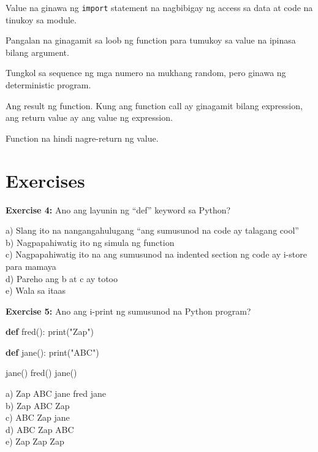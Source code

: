 \documentclass[10pt,]{book}
\newenvironment{Shaded}{}{}
\newcommand{\BuiltInTok}[1]{\textcolor[rgb]{0.00,0.50,0.00}{#1}}
\newcommand{\KeywordTok}[1]{\textcolor[rgb]{0.00,0.44,0.13}{\textbf{#1}}}
\newcommand{\NormalTok}[1]{#1}
\newcommand{\StringTok}[1]{\textcolor[rgb]{0.25,0.44,0.63}{#1}}
\begin{document}
\begin{description}
Value na ginawa ng \texttt{import} statement na nagbibigay ng access sa
data at code na tinukoy sa module. 
\item[parameter]
Pangalan na ginagamit sa loob ng function para tumukoy sa value na
ipinasa bilang argument. 
\item[pseudorandom]
Tungkol sa sequence ng mga numero na mukhang random, pero ginawa ng
deterministic program. 
\item[return value]
Ang result ng function. Kung ang function call ay ginagamit bilang
expression, ang return value ay ang value ng expression.
\item[void function]
Function na hindi nagre-return ng value. 
\end{description}

\section{Exercises}\label{exercises-3}

\textbf{Exercise 4:} Ano ang layunin ng ``def'' keyword sa Python?

a) Slang ito na nangangahulugang ``ang sumusunod na code ay talagang
cool''\\
b) Nagpapahiwatig ito ng simula ng function\\
c) Nagpapahiwatig ito na ang sumusunod na indented section ng code ay
i-store para mamaya\\
d) Pareho ang b at c ay totoo\\
e) Wala sa itaas

\textbf{Exercise 5:} Ano ang i-print ng sumusunod na Python program?

\begin{Shaded}
\begin{Highlighting}[]
\KeywordTok{def}\NormalTok{ fred():}
   \BuiltInTok{print}\NormalTok{(}\StringTok{"Zap"}\NormalTok{)}

\KeywordTok{def}\NormalTok{ jane():}
   \BuiltInTok{print}\NormalTok{(}\StringTok{"ABC"}\NormalTok{)}

\NormalTok{jane()}
\NormalTok{fred()}
\NormalTok{jane()}
\end{Highlighting}
\end{Shaded}

a) Zap ABC jane fred jane\\
b) Zap ABC Zap\\
c) ABC Zap jane\\
d) ABC Zap ABC\\
e) Zap Zap Zap
\end{document}
